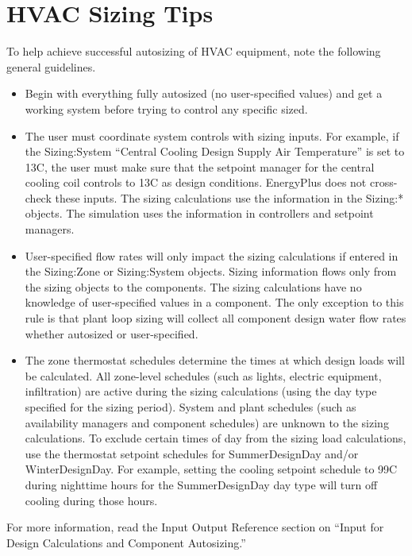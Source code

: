 \section{HVAC Sizing Tips}\label{hvac-sizing-tips}

To help achieve successful autosizing of HVAC equipment, note the following general guidelines.

\begin{itemize}
\item
  Begin with everything fully autosized (no user-specified values) and get a working system before trying to control any specific sized.
\item
  The user must coordinate system controls with sizing inputs. For example, if the Sizing:System ``Central Cooling Design Supply Air Temperature'' is set to 13C, the user must make sure that the setpoint manager for the central cooling coil controls to 13C as design conditions. EnergyPlus does not cross-check these inputs. The sizing calculations use the information in the Sizing:* objects. The simulation uses the information in controllers and setpoint managers.
\item
  User-specified flow rates will only impact the sizing calculations if entered in the Sizing:Zone or Sizing:System objects. Sizing information flows only from the sizing objects to the components. The sizing calculations have no knowledge of user-specified values in a component. The only exception to this rule is that plant loop sizing will collect all component design water flow rates whether autosized or user-specified.
\item
  The zone thermostat schedules determine the times at which design loads will be calculated. All zone-level schedules (such as lights, electric equipment, infiltration) are active during the sizing calculations (using the day type specified for the sizing period). System and plant schedules (such as availability managers and component schedules) are unknown to the sizing calculations. To exclude certain times of day from the sizing load calculations, use the thermostat setpoint schedules for SummerDesignDay and/or WinterDesignDay. For example, setting the cooling setpoint schedule to 99C during nighttime hours for the SummerDesignDay day type will turn off cooling during those hours.
\end{itemize}

For more information, read the Input Output Reference section on ``Input for Design Calculations and Component Autosizing.''
